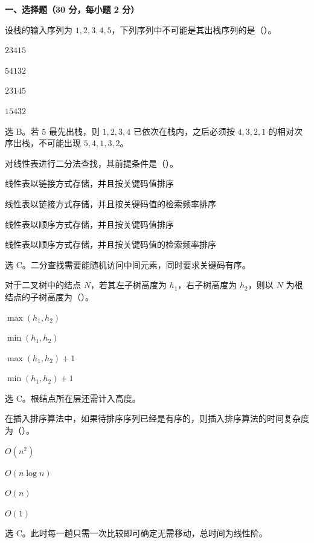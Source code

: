 \textbf{一、选择题（30 分，每小题 2 分）}

\begin{question}
设栈的输入序列为 $1,2,3,4,5$，下列序列中不可能是其出栈序列的是（\quad）。
\begin{choiceoptions}[2]
  \item $23415$
  \item $54132$
  \item $23145$
  \item $15432$
\end{choiceoptions}
\begin{solution}
选 B。若 $5$ 最先出栈，则 $1,2,3,4$ 已依次在栈内，之后必须按 $4,3,2,1$ 的相对次序出栈，不可能出现 $5,4,1,3,2$。
\end{solution}
\end{question}

\begin{question}
对线性表进行二分法查找，其前提条件是（\quad）。
\begin{choiceoptions}[2]
  \item 线性表以链接方式存储，并且按关键码值排序
  \item 线性表以链接方式存储，并且按关键码值的检索频率排序
  \item 线性表以顺序方式存储，并且按关键码值排序
  \item 线性表以顺序方式存储，并且按关键码值的检索频率排序
\end{choiceoptions}
\begin{solution}
选 C。二分查找需要能随机访问中间元素，同时要求关键码有序。
\end{solution}
\end{question}

\begin{question}
对于二叉树中的结点 $N$，若其左子树高度为 $h_1$，右子树高度为 $h_2$，则以 $N$ 为根结点的子树高度为（\quad）。
\begin{choiceoptions}[2]
  \item $\max(h_1,h_2)$
  \item $\min(h_1,h_2)$
  \item $\max(h_1,h_2)+1$
  \item $\min(h_1,h_2)+1$
\end{choiceoptions}
\begin{solution}
选 C。根结点所在层还需计入高度。
\end{solution}
\end{question}

\begin{question}
在插入排序算法中，如果待排序序列已经是有序的，则插入排序算法的时间复杂度为（\quad）。
\begin{choiceoptions}[2]
  \item $O(n^2)$
  \item $O(n\log n)$
  \item $O(n)$
  \item $O(1)$
\end{choiceoptions}
\begin{solution}
选 C。此时每一趟只需一次比较即可确定无需移动，总时间为线性阶。
\end{solution}
\end{question}

